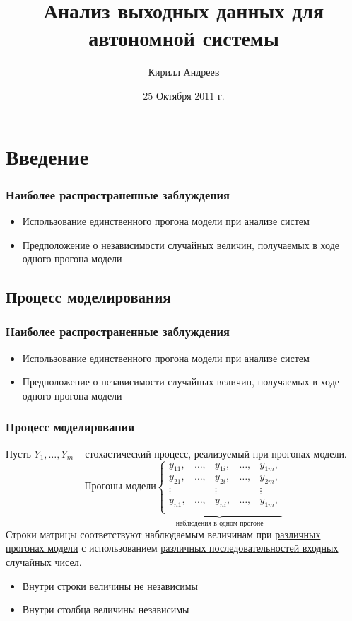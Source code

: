 \documentclass[utf8]{beamer}
\title{Анализ выходных данных для автономной системы}
\author {Кирилл Андреев}
\date{25 Октября 2011 г.}
\begin{document}
\begin{frame}
\titlepage
\end{frame}
\section {Введение}
\begin{frame}
\frametitle{Наиболее распространенные заблуждения}
\begin{itemize}
	\item Использование единственного прогона модели при анализе систем
	\item Предположение о независимости случайных величин, получаемых в ходе одного прогона модели
\end{itemize}
\end{frame}
\subsection{Процесс моделирования}
\begin{frame}
\frametitle{Наиболее распространенные заблуждения}
\begin{itemize}
	\item Использование единственного прогона модели при анализе систем
	\item Предположение о независимости случайных величин, получаемых в ходе одного прогона модели
\end{itemize}
\end{frame}
\begin{frame}
\frametitle{Процесс моделирования}
Пусть $Y_1, \ldots, Y_m$ -- стохастический процесс, реализуемый при прогонах модели.
$$
\textrm{Прогоны модели}
\underbrace{
\left\{
\begin{array}{ccccc}
y_{11}, & \ldots, & y_{1i} ,& \ldots, & y_{1m},\\
y_{21}, & \ldots, & y_{2i}, & \ldots, & y_{2m},\\
\vdots & &\vdots & &\vdots \\
y_{n1}, & \ldots, & y_{ni}, & \ldots, & y_{1m},\\
\end{array}
\right.
}_{\textrm{наблюдения в одном прогоне}}
$$
Строки матрицы соответствуют наблюдаемым величинам при \underline{различных прогонах модели} с использованием \underline{различных последовательностей входных случайных чисел}.
\begin{itemize}
	\item Внутри строки величины не независимы
	\item Внутри столбца величины независимы
\end{itemize}
\end{frame}
\end{document}
